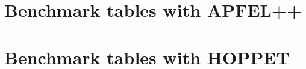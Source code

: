 \documentclass{article}
\begin{document}
\section{Benchmark tables with APFEL++}





\clearpage
\section{Benchmark tables with HOPPET}




\end{document}
